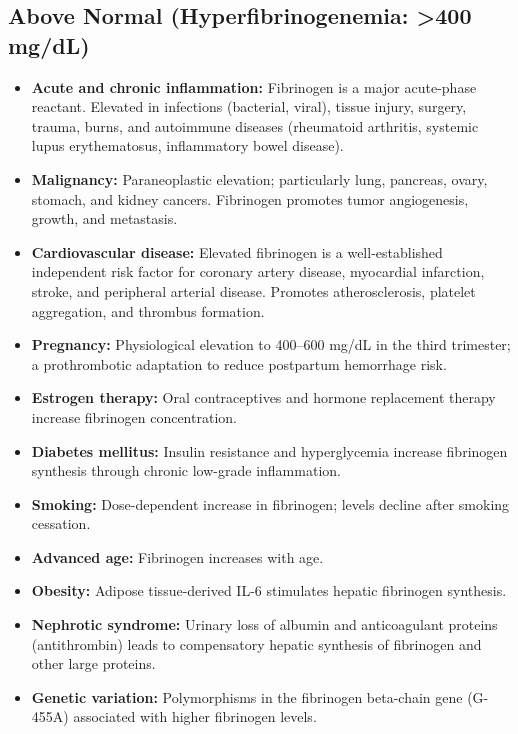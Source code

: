 \subsection*{Above Normal (Hyperfibrinogenemia: >400 mg/dL)}
\begin{itemize}
  \item \textbf{Acute and chronic inflammation:} Fibrinogen is a major acute-phase reactant. Elevated in infections (bacterial, viral), tissue injury, surgery, trauma, burns, and autoimmune diseases (rheumatoid arthritis, systemic lupus erythematosus, inflammatory bowel disease).
  \item \textbf{Malignancy:} Paraneoplastic elevation; particularly lung, pancreas, ovary, stomach, and kidney cancers. Fibrinogen promotes tumor angiogenesis, growth, and metastasis.
  \item \textbf{Cardiovascular disease:} Elevated fibrinogen is a well-established independent risk factor for coronary artery disease, myocardial infarction, stroke, and peripheral arterial disease. Promotes atherosclerosis, platelet aggregation, and thrombus formation.
  \item \textbf{Pregnancy:} Physiological elevation to 400--600 mg/dL in the third trimester; a prothrombotic adaptation to reduce postpartum hemorrhage risk.
  \item \textbf{Estrogen therapy:} Oral contraceptives and hormone replacement therapy increase fibrinogen concentration.
  \item \textbf{Diabetes mellitus:} Insulin resistance and hyperglycemia increase fibrinogen synthesis through chronic low-grade inflammation.
  \item \textbf{Smoking:} Dose-dependent increase in fibrinogen; levels decline after smoking cessation.
  \item \textbf{Advanced age:} Fibrinogen increases with age.
  \item \textbf{Obesity:} Adipose tissue-derived IL-6 stimulates hepatic fibrinogen synthesis.
  \item \textbf{Nephrotic syndrome:} Urinary loss of albumin and anticoagulant proteins (antithrombin) leads to compensatory hepatic synthesis of fibrinogen and other large proteins.
  \item \textbf{Genetic variation:} Polymorphisms in the fibrinogen beta-chain gene (G-455A) associated with higher fibrinogen levels.
\end{itemize}

